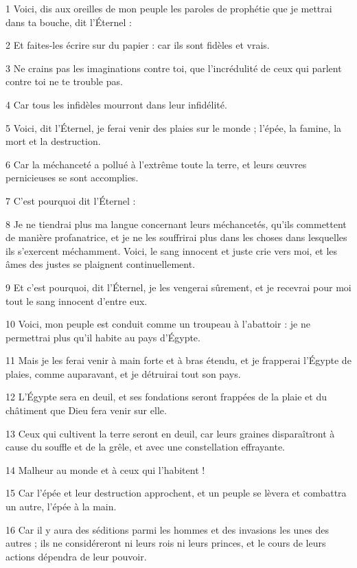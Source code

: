 \par 1 Voici, dis aux oreilles de mon peuple les paroles de prophétie que je mettrai dans ta bouche, dit l'Éternel :
\par 2 Et faites-les écrire sur du papier : car ils sont fidèles et vrais.
\par 3 Ne crains pas les imaginations contre toi, que l'incrédulité de ceux qui parlent contre toi ne te trouble pas.
\par 4 Car tous les infidèles mourront dans leur infidélité.
\par 5 Voici, dit l'Éternel, je ferai venir des plaies sur le monde ; l'épée, la famine, la mort et la destruction.
\par 6 Car la méchanceté a pollué à l'extrême toute la terre, et leurs œuvres pernicieuses se sont accomplies.
\par 7 C'est pourquoi dit l'Éternel :
\par 8 Je ne tiendrai plus ma langue concernant leurs méchancetés, qu'ils commettent de manière profanatrice, et je ne les souffrirai plus dans les choses dans lesquelles ils s'exercent méchamment. Voici, le sang innocent et juste crie vers moi, et les âmes des justes se plaignent continuellement.
\par 9 Et c'est pourquoi, dit l'Éternel, je les vengerai sûrement, et je recevrai pour moi tout le sang innocent d'entre eux.
\par 10 Voici, mon peuple est conduit comme un troupeau à l'abattoir : je ne permettrai plus qu'il habite au pays d'Égypte.
\par 11 Mais je les ferai venir à main forte et à bras étendu, et je frapperai l'Égypte de plaies, comme auparavant, et je détruirai tout son pays.
\par 12 L'Égypte sera en deuil, et ses fondations seront frappées de la plaie et du châtiment que Dieu fera venir sur elle.
\par 13 Ceux qui cultivent la terre seront en deuil, car leurs graines disparaîtront à cause du souffle et de la grêle, et avec une constellation effrayante.
\par 14 Malheur au monde et à ceux qui l'habitent !
\par 15 Car l'épée et leur destruction approchent, et un peuple se lèvera et combattra un autre, l'épée à la main.
\par 16 Car il y aura des séditions parmi les hommes et des invasions les unes des autres ; ils ne considéreront ni leurs rois ni leurs princes, et le cours de leurs actions dépendra de leur pouvoir.
